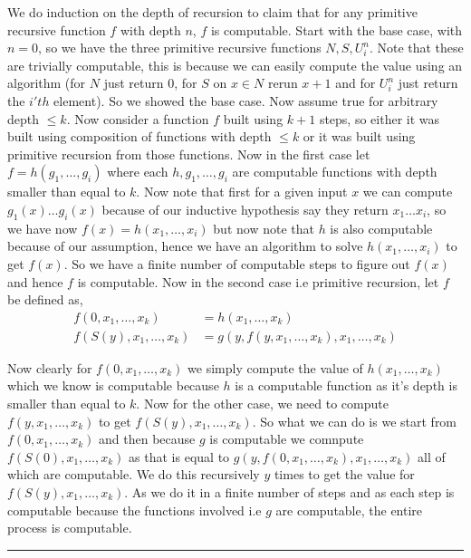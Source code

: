 \documentclass[11pt]{article}
\newenvironment{proof}{{\bf Proof:}}{\hfill\rule{2mm}{2mm}}
\begin{document}
\begin{enumerate}
      \begin{proof}
        We do induction on the depth of recursion to claim that for any primitive recursive function $f$ with depth $n$, $f$ is computable. Start with the base case, with $n = 0$, so we have the three primitive recursive functions $N, S, U_i^{n}$. Note that these are trivially computable, this is because we can easily compute the value using an algorithm (for $N$ just return $0$, for $S$ on $x \in N$ rerun $x + 1$ and for $U_i^{n}$ just return the $i'th$ element). So we showed the base case. Now assume true for arbitrary depth $\le k$. Now consider a function $f$ built using $k + 1$ steps, so either it was built using composition of functions with depth $\le k$ or it was built using primitive recursion from those functions. Now in the first case let $f = h(g_{1}, \dots, g_i)$ where each $h, g_{1}, \dots, g_i$ are computable functions with depth smaller than equal to $k$.  Now note that first for a given input $x$ we can compute $g_{1}(x) \dots g_i(x)$ because of our inductive hypothesis say they return $x_{1} \dots x_i$, so we have now $f(x) = h(x_{1}, \dots, x_i)$ but now note that $h$ is also computable because of our assumption, hence we have an algorithm to solve $h(x_{1}, \dots, x_i)$ to get $f(x)$. So we have a finite number of computable steps to figure out $f(x)$ and hence $f$ is computable. Now in the second case i.e primitive recursion, let $f$ be defined as, 
        \begin{align*}
          f(0, x_{1}, \dots, x_k) &= h(x_{1}, \dots, x_k)\\
          f(S(y), x_{1}, \dots, x_k) &= g(y, f(y, x_{1}, \dots, x_k), x_{1}, \dots, x_k)
        \end{align*}

        Now clearly for $f(0, x_{1}, \dots, x_k)$ we simply compute the value of $h(x_{1}, \dots, x_k)$ which we know is computable because $h$ is a computable function as it's depth is smaller than equal  to $k$. Now for the other case, we need to  compute $f(y, x_{1}, \dots, x_k)$ to get $f(S(y), x_{1}, \dots, x_k)$. So what we can do is we start from $f(0, x_{1}, \dots, x_k)$ and then because $g$ is computable we comnpute $f(S(0), x_{1}, \dots, x_k)$ as that is equal to $g(y, f(0, x_{1}, \dots, x_k), x_{1}, \dots, x_k)$ all of which are computable. We do this recursively $y$ times to get the value for $f(S(y), x_{1}, \dots, x_k)$. As we do it in a finite number of steps and as each step is computable because the functions involved i.e $g$ are computable, the entire process is computable. 


\end{proof}
\end{enumerate}
\end{document}
